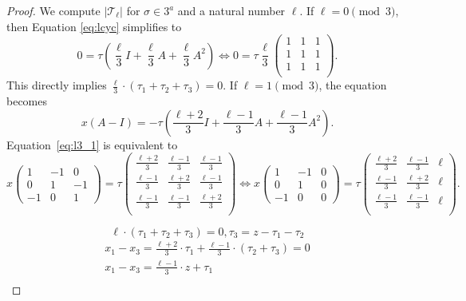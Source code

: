 \documentclass[12pt]{article}
\theoremstyle{definition}
\theoremstyle{remark}
\begin{document}
\begin{proof}
We compute $\vert \mathcal{T}_{\ell}\vert$ for $\sigma\in 3^a$ and a natural number $\ell.$
If $\ell = 0 \pmod 3$, then Equation \eqref{eq:lcyc} simplifies to
\begin{equation}\label{eq:l3_0}
0 = \tau \left(\frac{\ell}{3} I+ \frac{\ell}{3} A+\frac{\ell}{3} A^2\right)
\Leftrightarrow
0=\tau \frac{\ell}{3}\begin{pmatrix}
    1 & 1 & 1\\
1 & 1& 1\\
    1 & 1 &  1
    \\
\end{pmatrix}.
\end{equation}
This directly implies $
\frac{\ell}{3}\cdot(\tau_1+\tau_2+\tau_3)=0$.
If $\ell = 1 \pmod 3$, the equation becomes
\begin{equation}\label{eq:l3_1}
x\left( A- I\right) = -\tau \left(\frac{\ell+2}{3} I+ \frac{\ell -1}{3} A+ \frac{\ell -1}{3} A^2\right).
\end{equation}
 Equation~\eqref{eq:l3_1} is equivalent to
\begin{equation}
x\begin{pmatrix} 1 & -1 & 0 \\
 0& 1 & -1 \\
-1 & 0 & 1
\end{pmatrix}=\tau \begin{pmatrix}
    \frac{\ell+2}{3} & \frac{\ell -1}{3} & \frac{\ell -1}{3}\\
    \frac{\ell -1}{3} & \frac{\ell+2}{3} & \frac{\ell -1}{3}\\
    \frac{\ell -1}{3} & \frac{\ell -1}{3} &  \frac{\ell+2}{3}
    \\
\end{pmatrix}
\Leftrightarrow
x\begin{pmatrix} 1 & -1 & 0 \\
 0& 1 & 0 \\
-1 & 0 & 0
\end{pmatrix}=\tau \begin{pmatrix}
    \frac{\ell+2}{3} & \frac{\ell -1}{3} & \ell\\
    \frac{\ell -1}{3} & \frac{\ell+2}{3} & \ell\\
    \frac{\ell -1}{3} & \frac{\ell -1}{3} &  \ell
    \\
\end{pmatrix}.
\end{equation}
{\color{red}\[
\ell\cdot(\tau_1+\tau_2+\tau_3)=0, \tau_3=z-\tau_1-\tau_2
\]
\begin{align*}
   x_1-x_3=\frac{\ell+2}{3}\cdot\tau_1+\frac{\ell-1}{3}\cdot(\tau_2+\tau_3)=0\\
      x_1-x_3=\frac{\ell-1}{3}\cdot z+\tau_1\\
\end{align*}



}
\end{proof}
\end{document}
